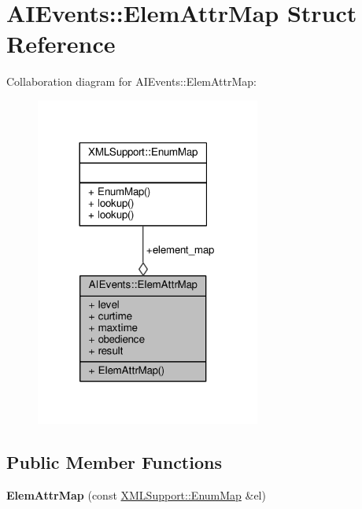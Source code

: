 \hypertarget{structAIEvents_1_1ElemAttrMap}{}\section{A\+I\+Events\+:\+:Elem\+Attr\+Map Struct Reference}
\label{structAIEvents_1_1ElemAttrMap}


Collaboration diagram for A\+I\+Events\+:\+:Elem\+Attr\+Map\+:
\nopagebreak
\begin{figure}[H]
\begin{center}
\leavevmode
\includegraphics[width=209pt]{db/d04/structAIEvents_1_1ElemAttrMap__coll__graph}
\end{center}
\end{figure}
\subsection*{Public Member Functions}
\begin{DoxyCompactItemize}
\item 
{\bfseries Elem\+Attr\+Map} (const \hyperlink{classXMLSupport_1_1EnumMap}{X\+M\+L\+Support\+::\+Enum\+Map} \&el)\hypertarget{structAIEvents_1_1ElemAttrMap_a6e41a3ea9492a6567a52b24abc846cda}{}\label{structAIEvents_1_1ElemAttrMap_a6e41a3ea9492a6567a52b24abc846cda}

\end{DoxyCompactItemize}
